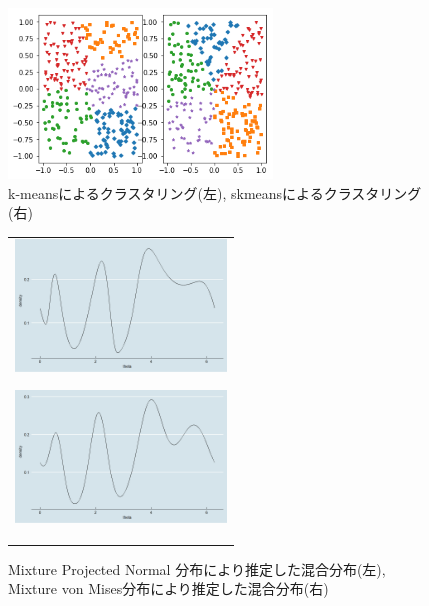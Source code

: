 \documentclass[a4j,11pt]{jarticle}
\begin{document}
\begin{figure}
\vspace{-0.6cm}
\centering
\includegraphics[keepaspectratio,width=70mm]{data/kmeans+skmeans.png}
\vspace{-1cm}
\caption{k-meansによるクラスタリング(左), skmeansによるクラスタリング(右)}
\label{kmeans}
\end{figure}

\begin{figure}[h]
 \begin{tabular}{c}
\hspace{0.5cm}
 \begin{minipage}{0.5\hsize}
  \begin{center}
   \includegraphics[clip,height= 35mm]{data/mix_pn.png}
  \end{center}
  \label{pnmix}
 \end{minipage}
\hspace{-1.0cm}
 \begin{minipage}{0.5\hsize}
  \begin{center}
   \includegraphics[clip,height= 35mm]{data/mix_von.png}
  \end{center}
  \label{vonmix}
 \end{minipage}
  \end{tabular}
\caption{Mixture Projected Normal 分布により推定した混合分布(左), Mixture von Mises分布により推定した混合分布(右)}
\end{figure}
\fi
\end{document}
